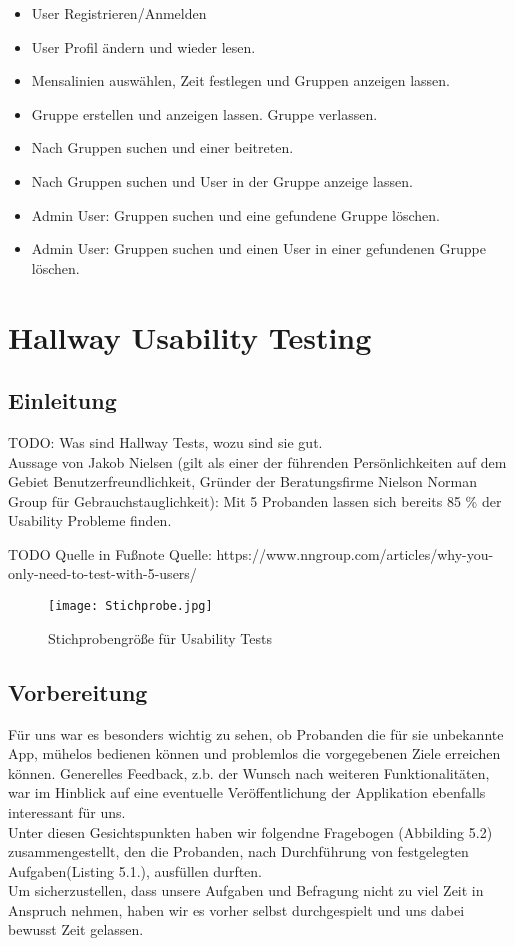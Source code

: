 \documentclass[a4paper]{scrreprt}
\begin{document}
\begin{itemize}

\item User Registrieren/Anmelden
\item User Profil ändern und wieder lesen.
\item Mensalinien auswählen, Zeit festlegen und Gruppen anzeigen lassen.
\item Gruppe erstellen und anzeigen lassen. Gruppe verlassen.
\item Nach Gruppen suchen und einer beitreten.
\item Nach Gruppen suchen und User in der Gruppe anzeige lassen.
\item Admin User: Gruppen suchen und eine gefundene Gruppe löschen.
\item Admin User: Gruppen suchen und einen User in einer gefundenen Gruppe löschen.

\end{itemize}

\chapter{Hallway Usability Testing}

\section{Einleitung}
TODO: Was sind Hallway Tests, wozu sind sie gut. \\

Aussage von Jakob Nielsen (gilt als einer der führenden Persönlichkeiten auf dem Gebiet Benutzerfreundlichkeit, Gründer der Beratungsfirme Nielson Norman Group für Gebrauchstauglichkeit): Mit 5 Probanden lassen sich bereits 85 \% der Usability Probleme finden.

TODO Quelle in Fußnote
Quelle:  https://www.nngroup.com/articles/why-you-only-need-to-test-with-5-users/ 
\begin{figure}[ht]
	\centering
  \texttt{[image: Stichprobe.jpg]}
	\caption{Stichprobengröße für Usability Tests}
	\label{fig2}
\end{figure}
\newpage
\section{Vorbereitung}
Für uns war es besonders wichtig zu sehen, ob Probanden die für sie unbekannte App, mühelos bedienen können und problemlos die vorgegebenen Ziele erreichen können.
Generelles Feedback, z.b. der Wunsch nach weiteren Funktionalitäten, war im Hinblick auf eine eventuelle Veröffentlichung der Applikation ebenfalls interessant für uns. \\
Unter diesen Gesichtspunkten haben wir folgendne Fragebogen (Abbilding 5.2) zusammengestellt, den die Probanden, nach Durchführung von festgelegten Aufgaben(Listing 5.1.), ausfüllen durften.\\
Um sicherzustellen, dass unsere Aufgaben und Befragung nicht zu viel Zeit in Anspruch nehmen, haben wir es vorher selbst durchgespielt und uns dabei bewusst Zeit gelassen.
\end{document}
